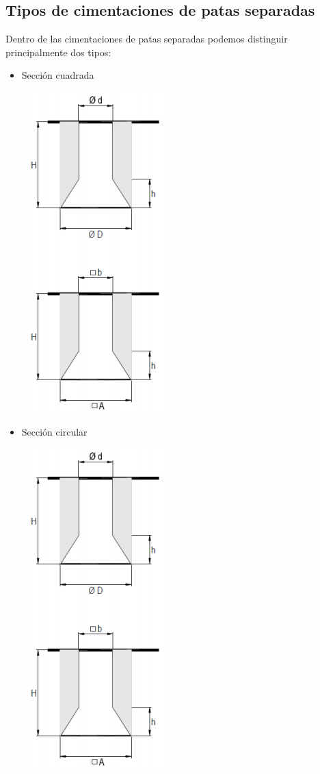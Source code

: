 \documentclass{article}
\begin{document}
    \subsection{Tipos de cimentaciones de patas separadas}
        Dentro de las cimentaciones de patas separadas podemos distinguir principalmente dos tipos:
        \begin{itemize}
            \item Sección cuadrada \begin{center}
            \includegraphics[trim={0 0 0 6.5cm},clip]{assets/img/Patas Separadas/Seccion circular o cuadrada.png}
            \end{center}
            \item Sección circular \begin{center}
            \includegraphics[trim={0 6.5cm 0 0},clip]{assets/img/Patas Separadas/Seccion circular o cuadrada.png}
            \end{center}
        \end{itemize}
\end{document}
